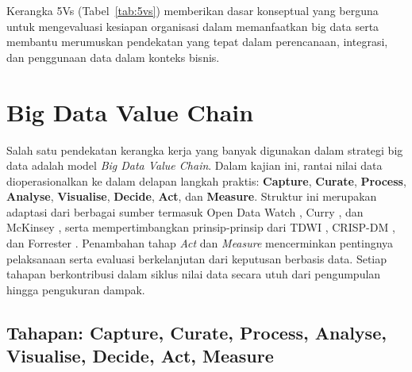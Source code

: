 \begin{longtable}{|p{}|p{}|p{}|}
\end{longtable}



Kerangka 5Vs (Tabel~\ref{tab:5vs}) memberikan dasar konseptual yang berguna untuk mengevaluasi kesiapan organisasi dalam memanfaatkan big data serta membantu merumuskan pendekatan yang tepat dalam perencanaan, integrasi, dan penggunaan data dalam konteks bisnis.

\section{Big Data Value Chain}

Salah satu pendekatan kerangka kerja yang banyak digunakan dalam strategi big data adalah model \textit{Big Data Value Chain}. Dalam kajian ini, rantai nilai data dioperasionalkan ke dalam delapan langkah praktis: \textbf{Capture}, \textbf{Curate}, \textbf{Process}, \textbf{Analyse}, \textbf{Visualise}, \textbf{Decide}, \textbf{Act}, dan \textbf{Measure}. Struktur ini merupakan adaptasi dari berbagai sumber termasuk Open Data Watch \cite{opendatawatch2020}, Curry \cite{curry2016}, dan McKinsey \cite{mckinsey2021}, serta mempertimbangkan prinsip-prinsip dari TDWI \cite{tdwi2013}, CRISP-DM \cite{crispdm1999}, dan Forrester \cite{forrester2016}. Penambahan tahap \textit{Act} dan \textit{Measure} mencerminkan pentingnya pelaksanaan serta evaluasi berkelanjutan dari keputusan berbasis data. Setiap tahapan berkontribusi dalam siklus nilai data secara utuh dari pengumpulan hingga pengukuran dampak.

\subsection{Tahapan: Capture, Curate, Process, Analyse, Visualise, Decide, Act, Measure}



